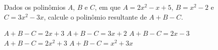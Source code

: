 Dados os polinômios $A$, $B$ e $C$, em que $A=2x^2-x+5$, $B=x^2-2$ e $C=3x^2-3x$, calcule o polinômio resultante de $A+B-C$.

$A+B-C=2x+3$
$A+B-C=3x+2$
$A+B-C=2x-3$
$A+B-C=2x^2+3$
$A+B-C=x^2+3x$





